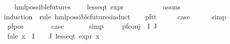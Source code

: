 \begin{isabellebody}
\ \ \ {\isachardoublequoteopen}hml{\isacharunderscore}{\kern0pt}possible{\isacharunderscore}{\kern0pt}futures\ {\isasymphi}{\isachardoublequoteclose}\isanewline
\ \ \ {\isachardoublequoteopen}less{\isacharunderscore}{\kern0pt}eq{\isacharunderscore}{\kern0pt}t\ {\isacharparenleft}{\kern0pt}expr\ {\isasymphi}{\isacharparenright}{\kern0pt}\ {\isacharparenleft}{\kern0pt}{\isasyminfinity}{\isacharcomma}{\kern0pt}\ {}{\isacharcomma}{\kern0pt}\ {\isasyminfinity}{\isacharcomma}{\kern0pt}\ {\isasyminfinity}{\isacharcomma}{\kern0pt}\ {\isasyminfinity}{\isacharcomma}{\kern0pt}\ {}{\isacharparenright}{\kern0pt}{\isachardoublequoteclose}\isanewline
%
\isadelimproof
\ \ %
\endisadelimproof
%
\isatagproof
{}\isamarkupfalse%
\ assms\isanewline
{}\isamarkupfalse%
{\isacharparenleft}{\kern0pt}induction\ {\isasymphi}\ rule{\isacharcolon}{\kern0pt}\ hml{\isacharunderscore}{\kern0pt}possible{\isacharunderscore}{\kern0pt}futures{\isachardot}{\kern0pt}induct{\isacharparenright}{\kern0pt}\isanewline
\ \ \isamarkupfalse%
\ pf{\isacharunderscore}{\kern0pt}tt\isanewline
\ \ \isamarkupfalse%
\ \isamarkupfalse%
\ {\isacharquery}{\kern0pt}case\isanewline
\ \ \ \ \isamarkupfalse%
\ simp\isanewline
{}\isamarkupfalse%
\isanewline
\ \ \isamarkupfalse%
\ {\isacharparenleft}{\kern0pt}pf{\isacharunderscore}{\kern0pt}pos\ {\isasymphi}\ {\isasymalpha}{\isacharparenright}{\kern0pt}\isanewline
\ \ \isamarkupfalse%
\ \isamarkupfalse%
\ {\isacharquery}{\kern0pt}case\ \isanewline
\ \ \ \ \isamarkupfalse%
\ simp\ \isanewline
{}\isamarkupfalse%
\isanewline
\ \ \isamarkupfalse%
\ {\isacharparenleft}{\kern0pt}pf{\isacharunderscore}{\kern0pt}conj\ {\isasymPhi}\ I\ J{\isacharparenright}{\kern0pt}\isanewline
\ \ \isamarkupfalse%
\ fa{\isacharunderscore}{\kern0pt}le{\isacharcolon}{\kern0pt}\ {\isachardoublequoteopen}{\isasymforall}x{\isasymin}{\isasymPhi}\ {\isacharbackquote}{\kern0pt}\ I\ {\isasymunion}\ {\isasymPhi}\ {\isacharbackquote}{\kern0pt}\ J{\isachardot}{\kern0pt}\ less{\isacharunderscore}{\kern0pt}eq{\isacharunderscore}{\kern0pt}t\ {\isacharparenleft}{\kern0pt}expr\ x{\isacharparenright}{\kern0pt}\ {\isacharparenleft}{\kern0pt}{\isasyminfinity}{\isacharcomma}{\kern0pt}\ {}{\isacharcomma}{\kern0pt}\ {}{\isacharcomma}{\kern0pt}\ {}{\isacharcomma}{\kern0pt}\ {}{\isacharcomma}{\kern0pt}\ {}{\isacharparenright}{\kern0pt}{\isachardoublequoteclose}\isanewline

\end{isabellebody}
